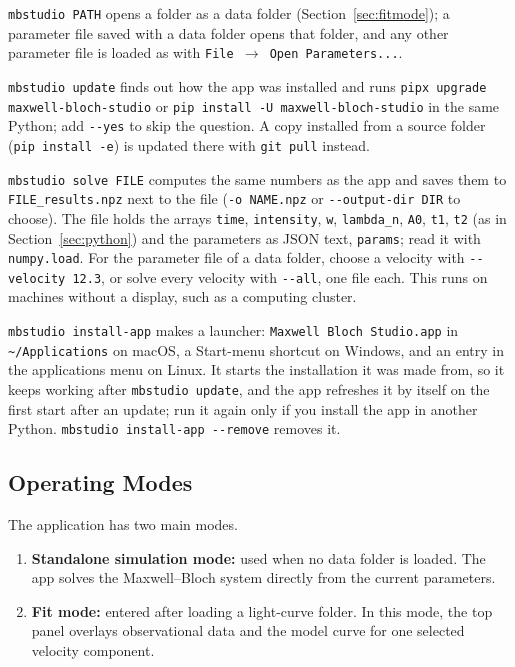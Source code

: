 \documentclass[12pt,a4paper]{article}
\newcommand{\menu}[1]{\texttt{#1}}
\begin{document}
\texttt{mbstudio PATH} opens a folder as a data folder (Section~\ref{sec:fitmode}); a
parameter file saved with a data folder opens that folder, and any other parameter file is
loaded as with \menu{File $\to$ Open Parameters...}.

\texttt{mbstudio update} finds out how the app was installed and runs
\texttt{pipx upgrade maxwell-bloch-studio} or \texttt{pip install -U maxwell-bloch-studio} in
the same Python; add \texttt{-{}-yes} to skip the question. A copy installed from a source folder
(\texttt{pip install -e}) is updated there with \texttt{git pull} instead.

\texttt{mbstudio solve FILE} computes the same numbers as the app and saves them to
\texttt{FILE\_results.npz} next to the file (\texttt{-o NAME.npz} or \texttt{-{}-output-dir DIR}
to choose). The file holds the arrays \texttt{time}, \texttt{intensity}, \texttt{w},
\texttt{lambda\_n}, \texttt{A0}, \texttt{t1}, \texttt{t2} (as in
Section~\ref{sec:python}) and the parameters as JSON text, \texttt{params}; read it with
\texttt{numpy.load}. For the parameter file of a data folder, choose a velocity with
\texttt{-{}-velocity 12.3}, or solve every velocity with \texttt{-{}-all}, one file each.
This runs on machines without a display, such as a computing cluster.

\texttt{mbstudio install-app} makes a launcher: \texttt{Maxwell Bloch Studio.app} in
\texttt{\textasciitilde/Applications} on macOS, a Start-menu shortcut on Windows, and an entry in the
applications menu on Linux. It starts the installation it was made from, so it keeps working
after \texttt{mbstudio update}, and the app refreshes it by itself on the first start after an
update; run it again only if you install the app in another Python.
\texttt{mbstudio install-app -{}-remove} removes it.

\subsection{Operating Modes}

The application has two main modes.

\begin{enumerate}[noitemsep]
  \item \textbf{Standalone simulation mode:} used when no data folder is loaded. The app solves the
  Maxwell--Bloch system directly from the current parameters.
  \item \textbf{Fit mode:} entered after loading a light-curve folder. In this mode, the top panel overlays
  observational data and the model curve for one selected velocity component.
\end{enumerate}
\end{document}
